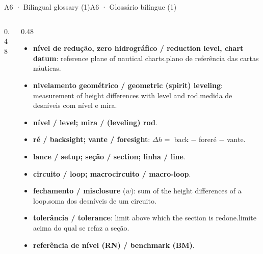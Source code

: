 \documentclass[aspectratio=169,11pt]{beamer}
\newcommand{\tr}[2]{\ifEN#2\else#1\fi}
\begin{document}
\begin{frame}{\tr{A6 · Glossário bilíngue (1)}{A6 · Bilingual glossary (1)}}
\begin{columns}[onlytextwidth]
\begin{column}{0.48\textwidth}
\begin{itemize}
      \end{itemize}
    \end{column}
    \begin{column}{0.48\textwidth}
      \begin{itemize}
        \setlength{\itemsep}{2pt}
        \item \textbf{nível de redução, zero hidrográfico / reduction level, chart datum}: \tr{plano de referência das cartas náuticas.}{reference plane of nautical charts.}
        \item \textbf{nivelamento geométrico / geometric (spirit) leveling}: \tr{medida de desníveis com nível e mira.}{measurement of height differences with level and rod.}
        \item \textbf{nível / level; mira / (leveling) rod}.
        \item \textbf{ré / backsight; vante / foresight}: $\Delta h=$ \tr{ré $-$ vante}{back $-$ fore}.
        \item \textbf{lance / setup; seção / section; linha / line}.
        \item \textbf{circuito / loop; macrocircuito / macro-loop}.
        \item \textbf{fechamento / misclosure} ($w$): \tr{soma dos desníveis de um circuito.}{sum of the height differences of a loop.}
        \item \textbf{tolerância / tolerance}: \tr{limite acima do qual se refaz a seção.}{limit above which the section is redone.}
        \item \textbf{referência de nível (RN) / benchmark (BM)}.
      \end{itemize}
    \end{column}
  \end{columns}
\end{frame}
\end{document}
